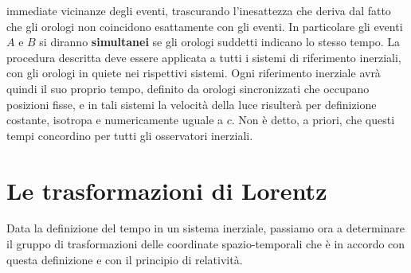 \documentclass[a4paper,11pt]{book}
\theoremstyle{plain}
\theoremstyle{definition}
\begin{document}
immediate vicinanze degli eventi, trascurando l'inesattezza che deriva dal fatto che gli 
orologi non coincidono esattamente con gli eventi. In particolare gli eventi $A$ e $B$ si 
diranno \textbf{simultanei} se gli orologi suddetti indicano lo stesso tempo. 
La procedura descritta deve essere applicata a tutti i sistemi di riferimento inerziali, con 
gli orologi in quiete nei rispettivi sistemi. Ogni riferimento inerziale avrà quindi il suo 
proprio tempo, definito da orologi sincronizzati che occupano posizioni fisse, e in tali 
sistemi la velocità della luce risulterà per definizione costante, isotropa e numericamente 
uguale a $c$. Non è detto, a priori, che questi tempi concordino per tutti gli osservatori 
inerziali. 

\section{Le trasformazioni di Lorentz}
Data la definizione del tempo in un sistema inerziale, passiamo ora a determinare il gruppo 
di trasformazioni delle coordinate spazio-temporali che è in accordo con questa definizione 
e con il principio di relatività. 
\end{document}
